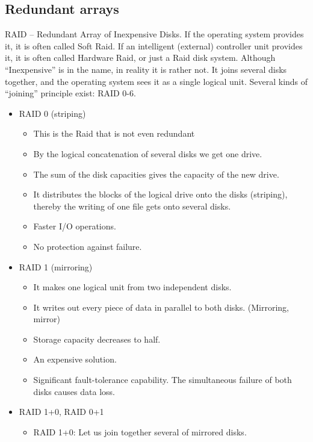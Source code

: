 \documentclass[margin=0px]{article}
\begin{document}
\subsection{Redundant arrays}

RAID -- Redundant Array of Inexpensive Disks. If the operating system provides it, it is often called Soft Raid. If an intelligent (external) controller unit provides it, it is often called Hardware Raid, or just a Raid disk system. Although ``Inexpensive'' is in the name, in reality it is rather not. It joins several disks together, and the operating system sees it as a single logical unit. Several kinds of ``joining'' principle exist: RAID 0-6.
\begin{itemize}
    \item RAID 0 (striping)
          \begin{itemize}
              \item This is the Raid that is not even redundant
              \item By the logical concatenation of several disks we get one drive.
              \item The sum of the disk capacities gives the capacity of the new drive.
              \item It distributes the blocks of the logical drive onto the disks (striping), thereby the writing of one file gets onto several disks.
              \item Faster I/O operations.
              \item No protection against failure.
          \end{itemize}
    \item RAID 1 (mirroring)
          \begin{itemize}
              \item It makes one logical unit from two independent disks.
              \item It writes out every piece of data in parallel to both disks. (Mirroring, mirror)
              \item Storage capacity decreases to half.
              \item An expensive solution.
              \item Significant fault-tolerance capability. The simultaneous failure of both disks causes data loss.
          \end{itemize}
    \item RAID 1+0, RAID 0+1
          \begin{itemize}
              \item RAID 1+0: Let us join together several of mirrored disks.

\end{itemize}
\end{itemize}
\end{document}

